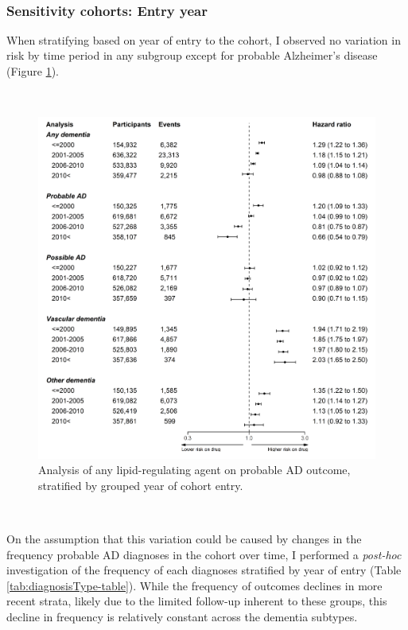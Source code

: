\documentclass[a4paper, twoside]{templates/ociamthesis}
\begin{document}
~

\hypertarget{sensitivity-cohorts-entry-year}{%
\subsubsection{Sensitivity cohorts: Entry year}\label{sensitivity-cohorts-entry-year}}

When stratifying based on year of entry to the cohort, I observed no variation in risk by time period in any subgroup except for probable Alzheimer's disease (Figure \ref{fig:diagnosisTypeFig}).

~





\begin{figure}[H]
\includegraphics[width=1\linewidth]{figures/cprd-analysis/forester_cohort_entry} \caption[Sensitivity analysis: grouped year of entry]{Analysis of any lipid-regulating agent on probable AD outcome, stratified by grouped year of cohort entry.}\label{fig:diagnosisTypeFig}
\end{figure}

~

On the assumption that this variation could be caused by changes in the frequency probable AD diagnoses in the cohort over time, I performed a \emph{post-hoc} investigation of the frequency of each diagnoses stratified by year of entry (Table \ref{tab:diagnosisType-table}). While the frequency of outcomes declines in more recent strata, likely due to the limited follow-up inherent to these groups, this decline in frequency is relatively constant across the dementia subtypes.
\end{document}
